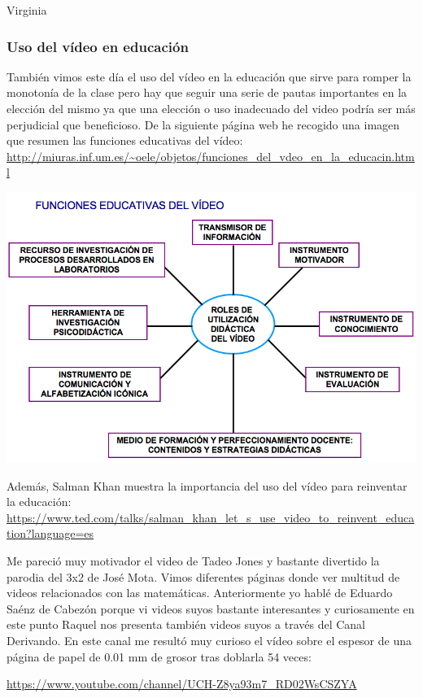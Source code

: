 \begin{opin}{\virgicolor}{Virginia}
\subsubsection{Uso del vídeo en educación}
También vimos este día el uso del vídeo en la educación que sirve para romper la monotonía de la clase pero hay que seguir una serie de pautas importantes en la elección del mismo ya que una elección o uso inadecuado del video podría ser más perjudicial que beneficioso. De la siguiente página web he recogido una imagen que resumen las funciones educativas del vídeo:
\url{http://miuras.inf.um.es/~oele/objetos/funciones_del_vdeo_en_la_educacin.html}


\begin{minipage}[hbtp]{1.0\linewidth}
	\centering
	\includegraphics[width=0.85\linewidth]{img/videoeducacion.jpg}
	\label{videoeducacion}
\end{minipage}

Además, Salman Khan muestra la importancia del uso del vídeo para reinventar la educación: \url{https://www.ted.com/talks/salman_khan_let_s_use_video_to_reinvent_education?language=es}

Me pareció muy motivador el video de Tadeo Jones y bastante divertido la parodia del 3x2 de José Mota. Vimos diferentes páginas donde ver multitud de videos relacionados con las matemáticas. Anteriormente yo hablé de Eduardo Saénz de Cabezón porque vi videos suyos bastante interesantes y curiosamente en este punto Raquel nos presenta también videos suyos a través del Canal Derivando. En este canal me resultó muy curioso el vídeo sobre el espesor de una página de papel de 0.01 mm de grosor tras doblarla 54 veces:

\url{https://www.youtube.com/channel/UCH-Z8ya93m7_RD02WsCSZYA}


\end{opin}
